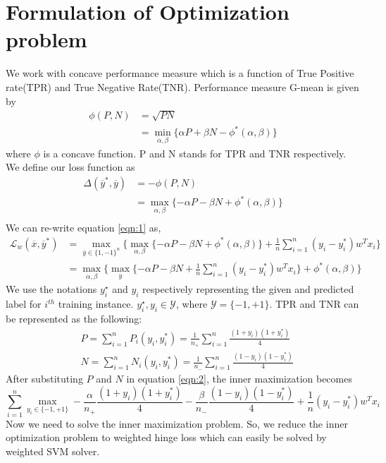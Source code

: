 \documentclass{article} %
\begin{document}
\section{Formulation of Optimization problem}
We work with concave performance measure which is a function of True Positive rate(TPR) and True Negative Rate(TNR). Performance measure G-mean is given by
\begin{equation*}
\begin{split}
	\phi(P,N) &=\sqrt{PN}\\
	& = \min_{\alpha,\beta}\{\alpha P+\beta N - \phi^*(\alpha,\beta)\}
\end{split}
\end{equation*}
where $\phi$ is a concave function. P and N stands for TPR and TNR respectively. We define our loss function as
\begin{equation*}
\begin{split}
	\Delta(\overline{y}^*,\overline{y}) &= -\phi(P,N) \\
	&= \max_{\alpha,\beta}\{-\alpha P-\beta N + \phi^*(\alpha,\beta)\}\\
\end{split}
\end{equation*}
We can re-write equation \ref{eqn:1} as,
\begin{equation*}
\label{eqn:2}
\begin{split}
	\mathcal L_w(\overline{x},\overline{y}^*)\nonumber &=\max_{\overline{y}\in\{1,-1\}^n}\{\max_{\alpha,\beta}\{-\alpha P-\beta N +\phi^*(\alpha,\beta)\} + \frac{1}{n}\sum_{i=1}^n (y_i - y_i^*)w^Tx_i\}\nonumber\\
	&=\max_{\alpha,\beta}\{\max_{\overline{y}}\{-\alpha P-\beta N  + \frac{1}{n}\sum_{i=1}^n (y_i - y_i^*)w^Tx_i\}+\phi^*(\alpha,\beta)\}
\end{split}
\end{equation*}
We use the notations $y_i^{\star}$ and $y_i$ respectively representing the given and predicted label for $i^{th}$ training instance. $y_i^{\star},y_i\in\mathcal{Y}$, where $\mathcal{Y}=\{-1,+1\}$. TPR and TNR can be represented as the following:
\begin{equation*}
\begin{split}
	&P = \sum_{i=1}^nP_i(y_i,y_i^*)= \frac{1}{n_+}\sum_{i=1}^n\frac{(1+y_i)(1+y_i^*)}{4}\\
	&N = \sum_{i=1}^nN_i(y_i,y_i^*)= \frac{1}{n_-}\sum_{i=1}^n\frac{(1-y_i)(1-y_i^*)}{4}
\end{split}
\end{equation*}
After substituting $P$ and $N$ in equation \ref{eqn:2}, the inner maximization becomes
\begin{equation}
\sum_{i=1}^n\max_{y_i\in\{-1,+1\}}-\frac{\alpha}{n_+}\frac{(1+y_i)(1+y_i^*)}{4} - \frac{\beta}{n_-}\frac{(1-y_i)(1-y_i^*)}{4} + \frac{1}{n}(y_i - y_i^*)w^Tx_i
\end{equation}
Now we need to solve the inner maximization problem. So, we reduce the inner optimization problem to weighted hinge loss which can easily be solved by weighted SVM solver.
\end{document}
